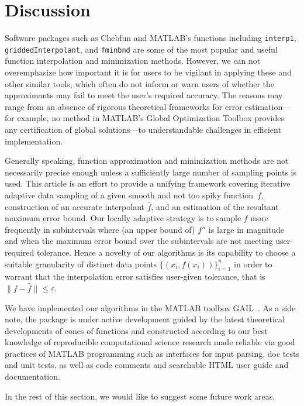 \documentclass[review]{elsarticle}
\newcommand{\abstol}{\varepsilon}
\theoremstyle{definition}
\begin{document}
\section{Discussion}

Software packages such as Chebfun and MATLAB's functions including
\texttt{interp1}, \texttt{griddedInterpolant}, and \texttt{fminbnd} are some of
the most popular and useful function interpolation and minimization methods.
However, we can not overemphasize how important it is for users to be vigilant
in applying these and other similar tools, which often do not inform or warn
users of whether the approximants may fail to meet the user's required accuracy.
The reasons may range from an absence of rigorous theoretical frameworks for
error estimation---for example, no method in MATLAB's Global Optimization
Toolbox provides any certification of global solutions---to understandable
challenges in efficient implementation.

Generally speaking, function approximation and minimization methods are not
necessarily precise enough unless a sufficiently large number of sampling points
is used. This article is an effort to provide a unifying framework covering
iterative adaptive data sampling of a given smooth and not too spiky
function~$f$, construction of an accurate interpolant $\hat{f}$, and an
estimation of the resultant maximum error bound. Our locally adaptive strategy
is to sample $f$ more frequently in subintervals where (an upper bound of) $f''$
is large in magnitude and when the maximum error bound over the subintervals are
not meeting user-required tolerance. Hence a novelty of our algorithms is its
capability to choose a suitable granularity of distinct data points $\{(x_i,
f(x_i))\}_{i=1}^n$ in order to warrant that the interpolation error satisfies
user-given tolerance, that is $\| f - \hat{f} \| \le \abstol$.

We have implemented our algorithms in the MATLAB toolbox GAIL~\cite{ChoEtal15a}.
As a side note, the package is under active development guided by the latest
theoretical developments of cones of functions and constructed according to our
best knowledge of reproducible computational science research made reliable via
good practices of MATLAB programming such as interfaces for input parsing, doc
tests and unit tests, as well as code comments and searchable HTML user guide
and documentation.

In the rest of this section, we would like to suggest some future work areas.
\end{document}
